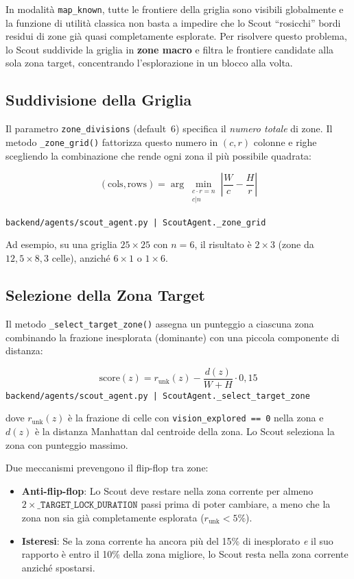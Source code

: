 In modalit\`a \texttt{map\_known}, tutte le frontiere della griglia sono visibili
globalmente e la funzione di utilit\`a classica non basta a impedire che lo Scout
``rosicchi'' bordi residui di zone gi\`a quasi completamente esplorate. Per risolvere
questo problema, lo Scout suddivide la griglia in \textbf{zone macro} e filtra le
frontiere candidate alla sola zona target, concentrando l'esplorazione in un blocco
alla volta.

\subsection{Suddivisione della Griglia}

Il parametro \texttt{zone\_divisions} (default~6) specifica il \textit{numero totale}
di zone. Il metodo \texttt{\_zone\_grid()} fattorizza questo numero in $(c, r)$ colonne
e righe scegliendo la combinazione che rende ogni zona il pi\`u possibile quadrata:

$$(\text{cols}, \text{rows}) = \arg\min_{\substack{c \cdot r = n \\ c | n}} \left| \frac{W}{c} - \frac{H}{r} \right|$$

\noindent\hfill{\footnotesize\texttt{backend/agents/scout\_agent.py | ScoutAgent.\_zone\_grid}}

Ad esempio, su una griglia $25 \times 25$ con $n = 6$, il risultato \`e $2 \times 3$
(zone da $12{,}5 \times 8{,}3$ celle), anzich\'e $6 \times 1$ o $1 \times 6$.

\subsection{Selezione della Zona Target}

Il metodo \texttt{\_select\_target\_zone()} assegna un punteggio a ciascuna zona
combinando la frazione inesplorata (dominante) con una piccola componente di distanza:

$$\text{score}(z) = r_{\text{unk}}(z) - \frac{d(z)}{W + H} \cdot 0{,}15$$
\noindent\hfill{\footnotesize\texttt{backend/agents/scout\_agent.py | ScoutAgent.\_select\_target\_zone}}

dove $r_{\text{unk}}(z)$ \`e la frazione di celle con \texttt{vision\_explored == 0}
nella zona e $d(z)$ \`e la distanza Manhattan dal centroide della zona. Lo Scout
seleziona la zona con punteggio massimo.

Due meccanismi prevengono il flip-flop tra zone:

\begin{itemize}
    \item \textbf{Anti-flip-flop}: Lo Scout deve restare nella zona corrente per almeno
          \linebreak[2]$2 \times \texttt{\_TARGET\_LOCK\_DURATION}$ passi prima di poter cambiare,
          a meno che la zona non sia gi\`a completamente esplorata
          ($r_{\text{unk}} < 5\%$).
    \item \textbf{Isteresi}: Se la zona corrente ha ancora pi\`u del 15\%
          di inesplorato \textit{e} il suo rapporto \`e entro il 10\% della zona migliore,
          lo Scout resta nella zona corrente anzich\'e spostarsi.
\end{itemize}

